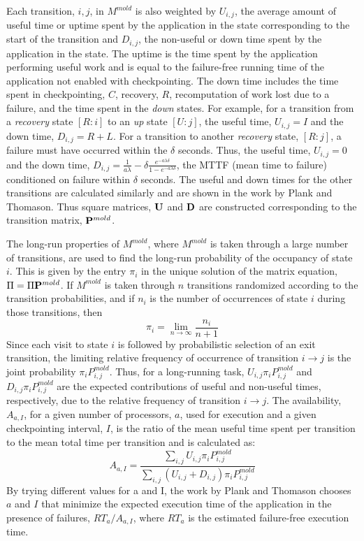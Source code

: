 \documentclass[conference,10pt]{IEEEtran}
\begin{document}
Each transition, $i,j$, in $M^{mold}$ is also weighted by $U_{i,j}$,
the average amount of useful time or uptime spent by the application
in the state corresponding to the start of the transition and
$D_{i,j}$, the non-useful or down time spent by the application in the
state. The uptime is the time spent by the application performing
useful work and is equal to the failure-free running time of the
application not enabled with checkpointing. The down time includes the
time spent in checkpointing, $C$, recovery, $R$, recomputation of work
lost due to a failure, and the time spent in the {\em down}
states.
For example, for a transition from a {\em recovery} state $[R:i]$ to
an {\em up} state $[U:j]$, the useful time, $U_{i,j} = I$ and the down time,
$D_{i,j}=R+L$.
For a transition to another
{\em recovery} state, $[R:j]$, a failure must have occurred within the
$\delta$ seconds. Thus, the useful time, $U_{i,j} = 0$ and the down
time, $D_{i,j}= \frac{1}{a\lambda}-\delta \frac{e^{-a\lambda
    \delta}}{1-e^{-a\lambda \delta}}$, the MTTF (mean time to failure)
conditioned on failure within $\delta$ seconds.
The useful and down
times for the other transitions are calculated similarly and are shown
in the work  by Plank and
Thomason\cite{plank-processorallocation-jpdc01}. Thus square matrices,
${\bf U}$ and ${\bf D}$ are constructed corresponding to the
transition matrix, ${\bf P}^{mold}$.

The long-run properties of $M^{mold}$, where $M^{mold}$ is taken
through a large number of transitions, are used to find the long-run
probability of the occupancy of state $i$. This is given by the entry
$\pi_i$  in the unique solution of the matrix equation, $\Pi = \Pi
{\bf P}^{mold}$. If $M^{mold}$ is taken through $n$ transitions
randomized according to the transition probabilities, and if $n_i$ is
the number of occurrences of state $i$ during those transitions, then
\begin{equation}
\pi_i = \lim_{n\to \infty} \frac{n_i}{n+1}
\end{equation}
Since each visit to state $i$ is followed by probabilistic selection
of an exit transition, the limiting relative frequency of occurrence of
transition $i\rightarrow j$ is the joint probability
$\pi_iP^{mold}_{i,j}$. Thus, for a long-running task,  $U_{i,j}\pi_i
P^{mold}_{i,j}$ and $D_{i,j}\pi_i P^{mold}_{i,j}$ are the expected
contributions of useful and non-useful times, respectively, due to the
relative frequency of transition $i\rightarrow j$. The availability,
$A_{a,I}$, for a given number of processors, $a$, used for execution
and a given checkpointing interval, $I$, is the ratio of the mean
useful time spent per transition to the mean total time per transition
and is calculated as:
\begin{equation}
A_{a,I} =
\frac{\sum_{i,j}U_{i,j}\pi_i P^{mold}_{i,j}}{\sum_{i,j}(U_{i,j}+D_{i,j})\pi_i
  P^{mold}_{i,j}}
\end{equation}
By trying different values for a and I, the work by Plank and Thomason
chooses $a$ and $I$ that minimize the expected execution time of the
application  in the presence of failures, $RT_a/A_{a,I}$, where $RT_a$
is the estimated failure-free execution time.
\end{document}
